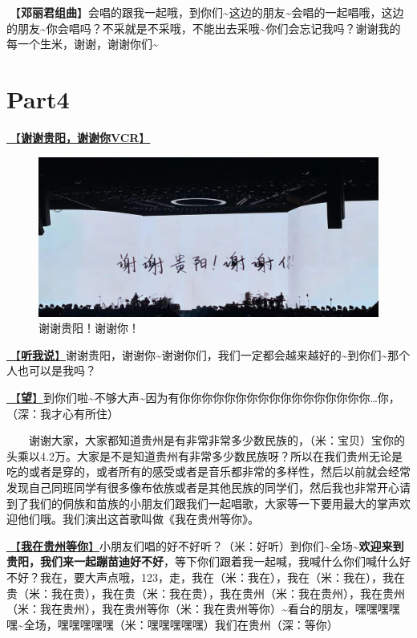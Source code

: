 \documentclass[]{ctexbook}
\begin{document}
🎵【\textbf{邓丽君组曲}】会唱的跟我一起哦，到你们\textasciitilde 这边的朋友\textasciitilde 会唱的一起唱哦，这边的朋友\textasciitilde 你会唱吗？不采就是不采哦，不能出去采哦\textasciitilde 你们会忘记我吗？谢谢我的每一个生米，谢谢，谢谢你们\textasciitilde{}

\section{Part4}\label{guiyang-20240713-part4}

\hyperref[thank-you-vcr]{🎥【\textbf{谢谢贵阳，谢谢你VCR}】}

\begin{figure}

{\centering \includegraphics[width=400pt]{img/guiyang20240713/thank-guiyang} 

}

\caption{谢谢贵阳！谢谢你！}\label{fig:unnamed-chunk-62}
\end{figure}

\hyperref[listen-to-me]{🎵【\textbf{听我说}】}谢谢贵阳，谢谢你\textasciitilde 谢谢你们，我们一定都会越来越好的\textasciitilde 到你们\textasciitilde 那个人也可以是我吗？

\hyperref[Gaze]{🎵【\textbf{望}】}到你们啦\textasciitilde 不够大声\textasciitilde 因为有你你你你你你你你你你你你你你你你你\ldots 你，（深：我才心有所住）

  谢谢大家，大家都知道贵州是有非常非常多少数民族的，（米：宝贝）宝你的头乘以4.2万。大家是不是知道贵州有非常多少数民族呀？所以在我们贵州无论是吃的或者是穿的，或者所有的感受或者是音乐都非常的多样性，然后以前就会经常发现自己同班同学有很多像布依族或者是其他民族的同学们，然后我也非常开心请到了我们的侗族和苗族的小朋友们跟我们一起唱歌，大家等一下要用最大的掌声欢迎他们哦。我们演出这首歌叫做《我在贵州等你》。

\hyperref[waitting-in-guizhou]{🎵【\textbf{我在贵州等你}】}小朋友们唱的好不好听？（米：好听）到你们\textasciitilde 全场\textasciitilde{}\textbf{欢迎来到贵阳，我们来一起蹦苗迪好不好}，等下你们跟着我一起喊，我喊什么你们喊什么好不好？我在，要大声点哦，123，走，我在（米：我在），我在（米：我在），我在贵（米：我在贵），我在贵（米：我在贵），我在贵州（米：我在贵州），我在贵州（米：我在贵州），我在贵州等你（米：我在贵州等你）\textasciitilde 看台的朋友，嘿嘿嘿嘿嘿\textasciitilde 全场，嘿嘿嘿嘿嘿（米：嘿嘿嘿嘿嘿）我们在贵州（深：等你）
\end{document}

